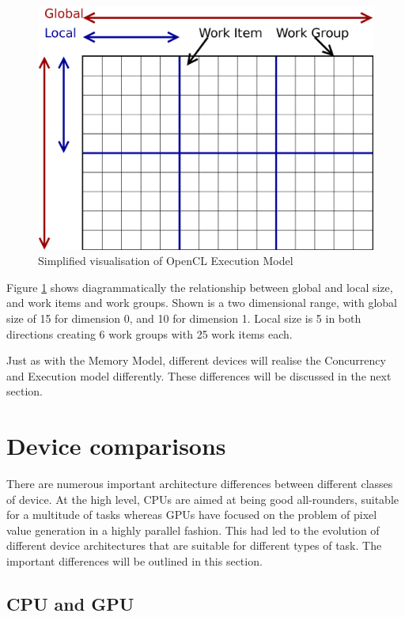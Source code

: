 \begin{figure}
\includegraphics[width=\linewidth]{images/openCLExecutionModel.png}
\caption{Simplified visualisation of OpenCL Execution Model}
\label{fig:openCLExecutionModel}
\end{figure}

Figure \ref{fig:openCLExecutionModel} shows diagrammatically the relationship
between global and local size, and work items and work groups. Shown is a two
dimensional range, with global size of 15 for dimension 0, and 10 for dimension
1. Local size is 5 in both directions creating 6 work groups with 25 work items
each.

Just as with the Memory Model, different devices will realise the Concurrency
and Execution model differently. These differences will be discussed in the next
section.

\section{Device comparisons}

There are numerous important architecture differences between different classes
of device. At the high level, CPUs are aimed at being good all-rounders,
suitable for a multitude of tasks whereas GPUs have focused on the problem of
pixel value generation in a highly parallel fashion. This had led to the
evolution of different device architectures that are suitable for different
types of task. The important differences will be outlined in this section.

\subsection{CPU and GPU}

